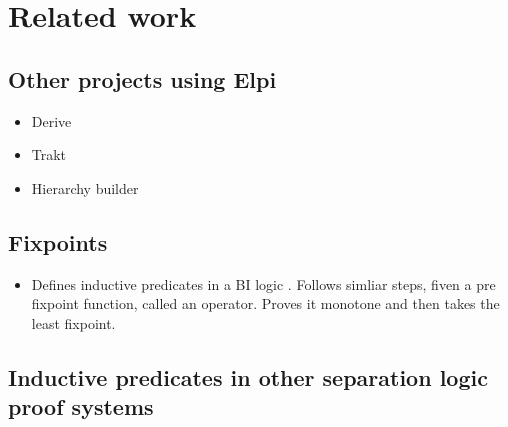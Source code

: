 \documentclass[thesis.tex]{subfiles}
\begin{document}
\VerbatimFootnotes

\chapter{Related work} \label{ch:relatedwork}

\section{Other projects using Elpi}
\begin{itemize}
    \item \cite{tassiDerivingProvedEquality2019} Derive
    \item \cite{blotCompositionalPreprocessingAutomated2023} Trakt
    \item \cite{cohenHierarchyBuilderAlgebraic2020} Hierarchy builder
\end{itemize}

\section{Fixpoints}
\begin{itemize}
    \item \cite{brotherstonFormalisedInductiveReasoning2007,brotherstonCyclicProofsProgram2008} Defines inductive predicates in a BI logic . Follows simliar steps, fiven a pre fixpoint function, called an operator. Proves it monotone and then takes the least fixpoint. 
\end{itemize}

\section{Inductive predicates in other separation logic proof systems}
\end{document}
